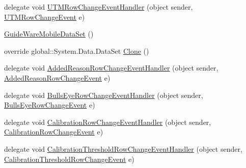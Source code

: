 \begin{DoxyCompactItemize}
delegate void \hyperlink{class_env_int_1_1_win32_1_1_field_tech_1_1_manager_1_1_data_sets_1_1_guide_ware_mobile_data_set_af15181f84aa3cca3b3d0445b6ba6e836}{U\+T\+M\+Row\+Change\+Event\+Handler} (object sender, \hyperlink{class_env_int_1_1_win32_1_1_field_tech_1_1_manager_1_1_data_sets_1_1_guide_ware_mobile_data_set_1_1_u_t_m_row_change_event}{U\+T\+M\+Row\+Change\+Event} e)
\item 
\hyperlink{class_env_int_1_1_win32_1_1_field_tech_1_1_manager_1_1_data_sets_1_1_guide_ware_mobile_data_set_a1220ad2590be3bea2d95f22e5bf3f99a}{Guide\+Ware\+Mobile\+Data\+Set} ()
\item 
override global\+::\+System.\+Data.\+Data\+Set \hyperlink{class_env_int_1_1_win32_1_1_field_tech_1_1_manager_1_1_data_sets_1_1_guide_ware_mobile_data_set_ab8ded11b1322ba9752fb14c75932c7cb}{Clone} ()
\item 
delegate void \hyperlink{class_env_int_1_1_win32_1_1_field_tech_1_1_manager_1_1_data_sets_1_1_guide_ware_mobile_data_set_aead16eee25126bf6e05556fe0f089c0c}{Added\+Reason\+Row\+Change\+Event\+Handler} (object sender, \hyperlink{class_env_int_1_1_win32_1_1_field_tech_1_1_manager_1_1_data_sets_1_1_guide_ware_mobile_data_set_03c6c2b8486bc739eb1146c140ad3745}{Added\+Reason\+Row\+Change\+Event} e)
\item 
delegate void \hyperlink{class_env_int_1_1_win32_1_1_field_tech_1_1_manager_1_1_data_sets_1_1_guide_ware_mobile_data_set_ad49d2ce7b82f70b47ec759d125a6e795}{Bulls\+Eye\+Row\+Change\+Event\+Handler} (object sender, \hyperlink{class_env_int_1_1_win32_1_1_field_tech_1_1_manager_1_1_data_sets_1_1_guide_ware_mobile_data_set_1_1_bulls_eye_row_change_event}{Bulls\+Eye\+Row\+Change\+Event} e)
\item 
delegate void \hyperlink{class_env_int_1_1_win32_1_1_field_tech_1_1_manager_1_1_data_sets_1_1_guide_ware_mobile_data_set_a86b53257f620f53ee62af7c3677d9475}{Calibration\+Row\+Change\+Event\+Handler} (object sender, \hyperlink{class_env_int_1_1_win32_1_1_field_tech_1_1_manager_1_1_data_sets_1_1_guide_ware_mobile_data_set_84870cfb39b084eaa7965416caa9d277}{Calibration\+Row\+Change\+Event} e)
\item 
delegate void \hyperlink{class_env_int_1_1_win32_1_1_field_tech_1_1_manager_1_1_data_sets_1_1_guide_ware_mobile_data_set_a2a61338e8d68c897b004fe6fa4479d4e}{Calibration\+Threshold\+Row\+Change\+Event\+Handler} (object sender, \hyperlink{class_env_int_1_1_win32_1_1_field_tech_1_1_manager_1_1_data_sets_1_1_guide_ware_mobile_data_set_fbaa872ead219fa1546c6a3dbe0bab70}{Calibration\+Threshold\+Row\+Change\+Event} e)

\end{DoxyCompactItemize}
